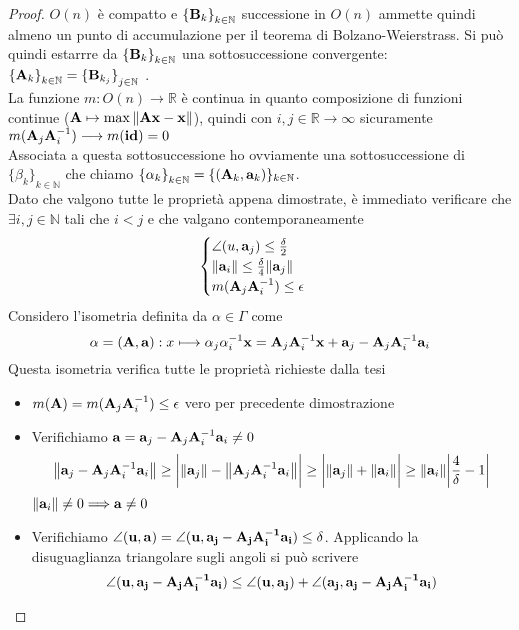 \documentclass[12pt,a4paper]{book}
\begin{document}
\begin{proof}
$O(n)$  è compatto e ${ \{\vb{B}_k \} }_{k \in \mathbb{N}}$ successione in  $O(n)$  ammette quindi almeno un punto di accumulazione per il teorema di Bolzano-Weierstrass. Si può quindi estarrre da ${ \{ \vb{B}_k \}}_{k \in \mathbb{N}}$  una sottosuccessione  convergente: $ { \{ \vb{A}_k \} }_{k \in \mathbb{N}} = { \{ \vb{B}_{k_j} \} }_{j \in \mathbb{N}}$ .  \\
\newpage
La funzione  $ m: O(n) \longrightarrow \mathbb{R}$  è continua in quanto composizione di funzioni continue ($ \vb{A} \mapsto \max{\norm{\vb{Ax-x}}} $), quindi con $i,j \in \mathbb{R} \longrightarrow \infty $ sicuramente $m(\vb{A}_j \vb{A}^{-1}_i) \longrightarrow m(\vb{id}) = 0 $ \\
Associata a questa sottosuccessione ho ovviamente una sottosuccessione di ${ \{\beta_k \}}_{k \in \mathbb{N}}$ che chiamo ${ \{\alpha_k \}}_{k \in \mathbb{N}} = \{ (\vb{A}_k , \vb{a}_k ) \}_{k \in \mathbb{N}}$. \\


Dato che valgono tutte le proprietà appena dimostrate, è immediato verificare che $\exists i,j \in \mathbb{N} $  tali che  $ i < j$  e che valgano contemporaneamente
\[ \begin{cases} \angle(u, \vb{a}_j ) \leq \frac{\delta}{2} \\
\norm{\vb{a}_i} \leq \frac{\delta}{4}\norm{\vb{a}_j} \\
m( \vb{A}_j \vb{A}^{-1}_i ) \leq \epsilon  \end{cases} \]
Considero l'isometria definita da $\alpha \in \Gamma$ come 
\[ \alpha = (\vb{A, a})  : x \longmapsto \alpha_j \alpha^{-1}_i \vb{x} = \vb{A}_j \vb{A}^{-1}_i \vb{x} + \vb{a}_j - \vb{A}_j \vb{A}^{-1}_i \vb{a}_i\]
Questa isometria verifica tutte le proprietà richieste dalla tesi

\begin{itemize}
\item $m(\vb{A}) = m(\vb{A}_j \vb{A}^{-1}_i) \leq \epsilon$ vero per precedente dimostrazione
\item Verifichiamo  $\vb{a}= \vb{a}_j - \vb{A}_j \vb{A}^{-1}_i \vb{a}_i \neq 0$ 
\[ \norm{\vb{a}_j - \vb{A}_j \vb{A}^{-1}_i \vb{a}_i} \geq \bigg| \norm{\vb{a}_j} - \norm{ \vb{A}_j \vb{A}^{-1}_i \vb{a}_i } \bigg| \geq \bigg| \norm{\vb{a}_j } + \norm{\vb{a}_i} \bigg| \geq \norm{\vb{a}_i} \bigg| \frac{4}{\delta} -1 \bigg| \]
$\norm{\vb{a}_i} \neq 0 \Longrightarrow \vb{a} \neq 0$
 
\item Verifichiamo $ \angle (\vb{u, a})  = \angle (\vb{u} , \vb{a_j - A_j A_i^{-1} a_i} ) \leq \delta $. Applicando la disuguaglianza triangolare sugli angoli si può scrivere
\begin{equation}
\angle (\vb{u} , \vb{a_j - A_j A_i^{-1} a_i} ) \leq \angle (\vb{u} , \vb{a_j}) + \angle(\vb{a_j}, \vb{a_j- A_j A_i^{-1} a_i} ) 
\end{equation}


\end{itemize}
\end{proof}
\end{document}
